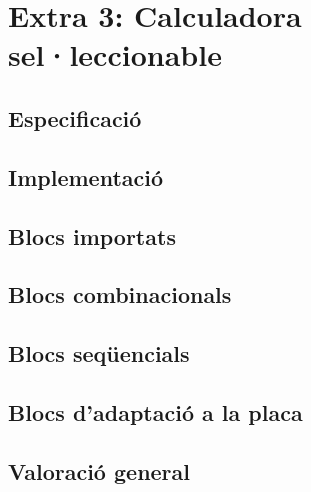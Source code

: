 \chapter{Extra 3: Calculadora sel·leccionable}

\section{Especificació}

\section{Implementació}


\section{Blocs importats}

\section{Blocs combinacionals}

\section{Blocs seqüencials}

\section{Blocs d'adaptació a la placa}

\section{Valoració general}


